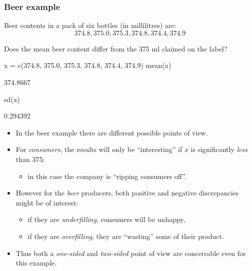 \documentclass[a4paper]{article}\usepackage[]{graphicx}\usepackage[]{xcolor}
\begin{document}
\subsubsection{Beer example}
Beer contents in a pack of six bottles (in millilitres) are:
\[
	374.8, 375.0, 375.3, 374.8, 374.4, 374.9
\]
\begin{goldbox}
	Does the mean beer content differ from the 375 ml claimed on the label?
\end{goldbox}
\begin{Schunk}
\begin{Sinput}
x = c(374.8, 375.0, 375.3, 374.8, 374.4, 374.9)
mean(x)
\end{Sinput}
\begin{Soutput}
[1] 374.8667
\end{Soutput}
\begin{Sinput}
sd(x)
\end{Sinput}
\begin{Soutput}
[1] 0.294392
\end{Soutput}
\end{Schunk}
\begin{itemize}
	\item In the beer example there are different possible points of view.
	\item For \textit{consumers}, the results will only be ``interesting'' if \( \overline{x} \) is significantly \textit{less} than 375:
	\begin{itemize}
		\item in this case the company is ``ripping consumers off''.
	\end{itemize}
	\item However for the \textit{beer} producers, both positive and negative discrepancies might be of interest:
	\begin{itemize}
		\item if they are \textit{underfilling}, consumers will be unhappy,
		\item if they are \textit{overfilling}, they are ``wasting'' some of their product.
	\end{itemize}
	\item Thus both a \textit{one-sided} and \textit{two-sided} point of view are conceivable even for this example.
\end{itemize}
\end{document}
